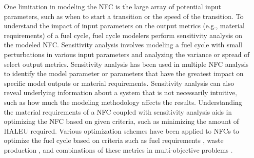 One limitation in modeling the \gls{NFC} is the large array of potential 
input parameters, such as when to start a transition or the speed of the 
transition. To understand 
the impact of input parameters on the output metrics (e.g., material 
requirements) of a fuel cycle, fuel cycle modelers perform sensitivity 
analysis on the 
modeled \gls{NFC}. Sensitivity analysis involves 
modeling a fuel cycle with small perturbations in various input 
parameters and analyzing the variance or spread of select output metrics. 
Sensitivity analysis has been used in multiple \gls{NFC} analysis 
\cite{chee_sensitivity_2019,feng_sensitivity_2020,thiolliere_methodology_2018}
to identify the model parameter or parameters that have the greatest 
impact on specific model outputs or material requirements. Sensitivity 
analysis can also reveal underlying information about a system that is not 
necessarily intuitive, such as how much the modeling methodology 
affects the results. Understanding the 
material requirements of a \gls{NFC} coupled with sensitivity analysis 
aids in optimizing the \gls{NFC} based on given criteria, such as 
minimizing the amount of \gls{HALEU} required. Various 
optimization schemes have been applied to \glspl{NFC} to optimize the fuel 
cycle based on criteria such as fuel requirements \cite{kim_selection_1999},
waste production \cite{shwageraus_optimization_2003}, and combinations 
of these metrics in multi-objective 
problems \cite{passerini_systematic_2014}.

